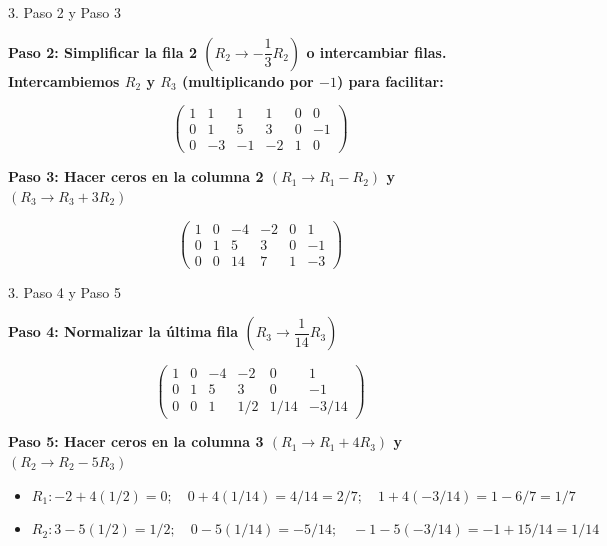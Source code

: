 \documentclass[10pt, aspectratio=169]{beamer}
\begin{document}
	\begin{frame}{3. Paso 2 y Paso 3}
		
		\noindent \textbf{Paso 2: Simplificar la fila 2
		$\left(R_2 \rightarrow -\dfrac{1}{3}R_2\right)$ o intercambiar filas.
		Intercambiemos $R_2$ y $R_3$ (multiplicando por $-1$) para facilitar:}
	
	\bigskip
	
	\[
	\left(
	\begin{array}{ccc|ccc}
		1 &  1 &  1 &  1 & 0 &  0 \\
		0 &  1 &  5 &  3 & 0 & -1 \\
		0 & -3 & -1 & -2 & 1 &  0
	\end{array}
	\right)
	\]
	
	\bigskip
	
	\noindent \textbf{Paso 3: Hacer ceros en la columna 2
		$(R_1 \rightarrow R_1 - R_2)$ y $(R_3 \rightarrow R_3 + 3R_2)$}
	
	\bigskip
	
	\[
	\left(
	\begin{array}{ccc|ccc}
		1 & 0 &  -4 & -2 & 0 &  1 \\
		0 & 1 &   5 &  3 & 0 & -1 \\
		0 & 0 &  14 &  7 & 1 & -3
	\end{array}
	\right)
	\]
	
	\end{frame}
	\begin{frame}{3. Paso 4 y Paso 5}
		
		\noindent \textbf{Paso 4: Normalizar la última fila
			$\left(R_3 \rightarrow \dfrac{1}{14}R_3\right)$}
		
		\bigskip
		
		\[
		\left(
		\begin{array}{ccc|ccc}
			1 & 0 & -4 & -2    & 0      &  1      \\
			0 & 1 &  5 &  3    & 0      & -1      \\
			0 & 0 &  1 &  1/2  & 1/14   & -3/14
		\end{array}
		\right)
		\]
		
		\bigskip
		
		\noindent \textbf{Paso 5: Hacer ceros en la columna 3
			$(R_1 \rightarrow R_1 + 4R_3)$ y $(R_2 \rightarrow R_2 - 5R_3)$}
		
		\begin{itemize}
			\item $R_1 : -2 + 4(1/2) = 0;\quad 0 + 4(1/14) = 4/14 = 2/7;\quad
			1 + 4(-3/14) = 1 - 6/7 = 1/7$
			
			\item $R_2 : 3 - 5(1/2) = 1/2;\quad 0 - 5(1/14) = -5/14;\quad
			-1 - 5(-3/14) = -1 + 15/14 = 1/14$
		\end{itemize}
	\end{frame}
	
\end{document}
